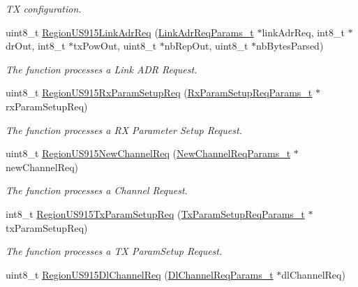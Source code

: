 \begin{DoxyCompactItemize}
\begin{DoxyCompactList}\small\item\em TX configuration. \end{DoxyCompactList}\item 
uint8\+\_\+t \mbox{\hyperlink{group___r_e_g_i_o_n_u_s915_gab4977ffc251303aaae4efec0eed63c23}{Region\+U\+S915\+Link\+Adr\+Req}} (\mbox{\hyperlink{group___r_e_g_i_o_n_gad4af503e8d4de1846129e26a799a1e8e}{Link\+Adr\+Req\+Params\+\_\+t}} $\ast$link\+Adr\+Req, int8\+\_\+t $\ast$dr\+Out, int8\+\_\+t $\ast$tx\+Pow\+Out, uint8\+\_\+t $\ast$nb\+Rep\+Out, uint8\+\_\+t $\ast$nb\+Bytes\+Parsed)
\begin{DoxyCompactList}\small\item\em The function processes a Link A\+DR Request. \end{DoxyCompactList}\item 
uint8\+\_\+t \mbox{\hyperlink{group___r_e_g_i_o_n_u_s915_ga026be3770dc9e5787af7e181a142d47f}{Region\+U\+S915\+Rx\+Param\+Setup\+Req}} (\mbox{\hyperlink{group___r_e_g_i_o_n_ga7165f282c670c728c36d534df2285157}{Rx\+Param\+Setup\+Req\+Params\+\_\+t}} $\ast$rx\+Param\+Setup\+Req)
\begin{DoxyCompactList}\small\item\em The function processes a RX Parameter Setup Request. \end{DoxyCompactList}\item 
uint8\+\_\+t \mbox{\hyperlink{group___r_e_g_i_o_n_u_s915_gaf6b93716eae04bcc5a2072b2f071fb0d}{Region\+U\+S915\+New\+Channel\+Req}} (\mbox{\hyperlink{group___r_e_g_i_o_n_gae2abcdb6dbb843c9faf5fd3009eca9d6}{New\+Channel\+Req\+Params\+\_\+t}} $\ast$new\+Channel\+Req)
\begin{DoxyCompactList}\small\item\em The function processes a Channel Request. \end{DoxyCompactList}\item 
int8\+\_\+t \mbox{\hyperlink{group___r_e_g_i_o_n_u_s915_ga3d328f69d8417596e26845406dd6b878}{Region\+U\+S915\+Tx\+Param\+Setup\+Req}} (\mbox{\hyperlink{group___r_e_g_i_o_n_ga26836ef2996e70410e42ef471073f855}{Tx\+Param\+Setup\+Req\+Params\+\_\+t}} $\ast$tx\+Param\+Setup\+Req)
\begin{DoxyCompactList}\small\item\em The function processes a TX Param\+Setup Request. \end{DoxyCompactList}\item 
uint8\+\_\+t \mbox{\hyperlink{group___r_e_g_i_o_n_u_s915_gaa4cc824d120b1ef55d88fae38282f8bc}{Region\+U\+S915\+Dl\+Channel\+Req}} (\mbox{\hyperlink{group___r_e_g_i_o_n_gae0d608ff1f8ea0a430e4f9a4c38ec7f3}{Dl\+Channel\+Req\+Params\+\_\+t}} $\ast$dl\+Channel\+Req)

\end{DoxyCompactItemize}
